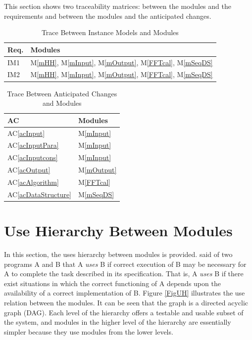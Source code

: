 \documentclass[12pt, titlepage]{article}
\newcommand{\acref}[1]{AC\ref{#1}}
\newcommand{\mref}[1]{M\ref{#1}}
\begin{document}
This section shows two traceability matrices: between the modules and the
requirements and between the modules and the anticipated changes.

\begin{table}[H]
\centering
\begin{tabular}{p{} p{}}
\toprule
\textbf{Req.} & \textbf{Modules}\\
\midrule
IM1 &\mref{mHH}, \mref{mInput}, \mref{mOutput},  \mref{FFTcal},  \mref{mSeqDS}\\
IM2 & \mref{mHH}, \mref{mInput}, \mref{mOutput}, \mref{FFTcal}, \mref{mSeqDS}\\
\bottomrule
\end{tabular}
\caption{Trace Between Instance Models and Modules}
\label{TblRT}
\end{table}

\begin{table}[H]
\centering
\begin{tabular}{p{} p{}}
\toprule
\textbf{AC} & \textbf{Modules}\\
\midrule
\acref{acInput} & \mref{mInput}\\
\acref{acInputPara} & \mref{mInput}\\
\acref{acInputcons} & \mref{mInput}\\
\acref{acOutput} & \mref{mOutput}\\
\acref{acAlgorithm} & \mref{FFTcal}\\
\acref{acDataStructure} & \mref{mSeqDS}\\
\bottomrule
\end{tabular}
\caption{Trace Between Anticipated Changes and Modules}
\label{TblACT}
\end{table}


\section{Use Hierarchy Between Modules} \label{SecUse}

In this section, the uses hierarchy between modules is
provided. \citet{Parnas1978} said of two programs A and B that A {\em uses} B if
correct execution of B may be necessary for A to complete the task described in
its specification. That is, A {\em uses} B if there exist situations in which
the correct functioning of A depends upon the availability of a correct
implementation of B.  Figure \ref{FigUH} illustrates the use relation between
the modules. It can be seen that the graph is a directed acyclic graph
(DAG). Each level of the hierarchy offers a testable and usable subset of the
system, and modules in the higher level of the hierarchy are essentially simpler
because they use modules from the lower levels.
\end{document}
